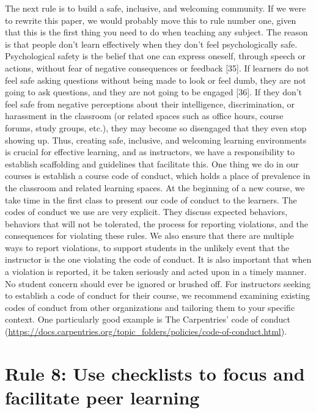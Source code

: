 \documentclass[
  10pt,
  letterpaper,
]{article}
\begin{document}
The next rule is to build a safe, inclusive, and welcoming community. If
we were to rewrite this paper, we would probably move this to rule
number one, given that this is the first thing you need to do when
teaching any subject. The reason is that people don't learn effectively
when they don't feel psychologically safe. Psychological safety is the
belief that one can express oneself, through speech or actions, without
fear of negative consequences or feedback {[}35{]}. If learners do not
feel safe asking questions without being made to look or feel dumb, they
are not going to ask questions, and they are not going to be engaged
{[}36{]}. If they don't feel safe from negative perceptions about their
intelligence, discrimination, or harassment in the classroom (or related
spaces such as office hours, course forums, study groups, etc.), they
may become so disengaged that they even stop showing up. Thus, creating
safe, inclusive, and welcoming learning environments is crucial for
effective learning, and as instructors, we have a responsibility to
establish scaffolding and guidelines that facilitate this. One thing we
do in our courses is establish a course code of conduct, which holds a
place of prevalence in the classroom and related learning spaces. At the
beginning of a new course, we take time in the first class to present
our code of conduct to the learners. The codes of conduct we use are
very explicit. They discuss expected behaviors, behaviors that will not
be tolerated, the process for reporting violations, and the consequences
for violating these rules. We also ensure that there are multiple ways
to report violations, to support students in the unlikely event that the
instructor is the one violating the code of conduct. It is also
important that when a violation is reported, it be taken seriously and
acted upon in a timely manner. No student concern should ever be ignored
or brushed off. For instructors seeking to establish a code of conduct
for their course, we recommend examining existing codes of conduct from
other organizations and tailoring them to your specific context. One
particularly good example is The Carpentries' code of conduct
(\url{https://docs.carpentries.org/topic_folders/policies/code-of-conduct.html}).

\section{Rule 8: Use checklists to focus and facilitate peer
learning}\label{sec-rule8}
\end{document}
